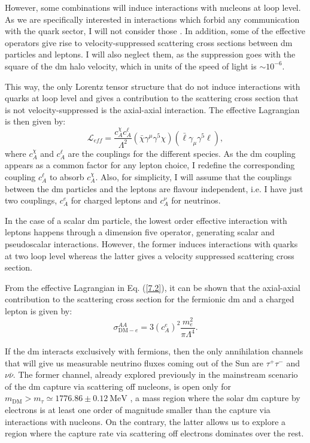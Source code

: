 However, some combinations will induce interactions with nucleons at loop level. As we are specifically interested in interactions which forbid any communication with the quark sector, I will not consider those \cite{Kopp2009}. In addition, some of the effective operators give rise to velocity-suppressed scattering cross sections between \gls{dm} particles and leptons. I will also neglect them, as the suppression goes with the square of the \gls{dm} halo velocity, which in units of the speed of light is $\sim 10^{-6}$.

This way, the only Lorentz tensor structure that do not induce interactions with quarks at loop level and gives a contribution to the scattering cross section that is not velocity-suppressed is the axial-axial interaction. The effective Lagrangian is then given by:
\begin{equation}\label{7.2}
	\mathcal{L}_{eff} = \frac{c_{A}^{\chi} c_{A}^{\ell}}{\Lambda^{2}} \left(\bar{\chi} \gamma^{\mu}\gamma^{5} \chi\right)\left(\bar{\ell} \gamma_{\mu}\gamma^{5} \ell\right),
\end{equation}
where $c_{A}^{\chi}$ and $c_{A}^{\ell}$ are the couplings for the different species. As the \gls{dm} coupling appears as a common factor for any lepton choice, I redefine the corresponding coupling $c_{A}^{\ell}$ to absorb $c_{A}^{\chi}$. Also, for simplicity, I will assume that the couplings between the \gls{dm} particles and the leptons are flavour independent, i.e. I have just two couplings, $c_{A}^{e}$ for charged leptons and $c_{A}^{\nu}$ for neutrinos.

In the case of a scalar \gls{dm} particle, the lowest order effective interaction with leptons happens through a dimension five operator, generating scalar and pseudoscalar interactions. However, the former induces interactions with quarks at two loop level whereas the latter gives a velocity suppressed scattering cross section.

From the effective Lagrangian in Eq. (\ref{7.2}), it can be shown that the axial-axial contribution to the scattering cross section for the fermionic \gls{dm} and a charged lepton is given by:
\begin{equation}\label{7.3}
	\sigma_{\mathrm{DM}-e}^{AA} = 3 \left(c_{A}^{e}\right)^{2} \frac{m_{e}^{2}}{\pi \Lambda^{4}}.
\end{equation}

If the \gls{dm} interacts exclusively with fermions, then the only annihilation channels that will give us measurable neutrino fluxes coming out of the Sun are $\tau^{+}\tau^{-}$ and $\nu\bar{\nu}$. The former channel, already explored previously in the mainstream scenario of the \gls{dm} capture via scattering off nucleons, is open only for $m_{\mathrm{DM}} > m_{\tau} \simeq 1776.86 \pm 0.12 \ \mathrm{MeV}$ \cite{ParticleDataGroup2020}, a mass region where the solar \gls{dm} capture by electrons is at least one order of magnitude smaller than the capture via interactions with nucleons. On the contrary, the latter allows us to explore a region where the capture rate via scattering off electrons dominates over the rest.

